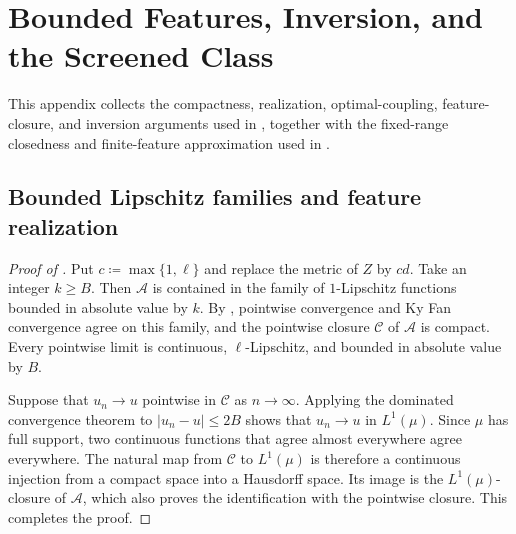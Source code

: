 \documentclass[10pt,a4paper]{amsart}
\begin{document}
\section{Bounded Features, Inversion, and the Screened Class}
\label{app:bounded-feature-inversion}

This appendix collects the compactness, realization, optimal-coupling, feature-closure, and inversion arguments used in , together with the fixed-range closedness and finite-feature approximation used in .

\subsection{Bounded Lipschitz families and feature realization}
\label{subsec:app-bounded-realization}

\begin{proof}[Proof of ]
Put $c\coloneqq\max\{1,\ell\}$ and replace the metric of $Z$ by $cd$. Take an integer $k\geq B$. Then $\mathcal A$ is contained in the family of $1$-Lipschitz functions bounded in absolute value by $k$. By \cite[Lemma~2.2 and Remark~2.3]{hanika2022gds}, pointwise convergence and Ky Fan convergence agree on this family, and the pointwise closure $\mathcal C$ of $\mathcal A$ is compact. Every pointwise limit is continuous, $\ell$-Lipschitz, and bounded in absolute value by $B$.

Suppose that $u_n\to u$ pointwise in $\mathcal C$ as $n\to\infty$. Applying the dominated convergence theorem \cite[Theorem~3.31, pp.~92--93]{axler2020mira} to $|u_n-u|\leq2B$ shows that $u_n\to u$ in $L^1(\mu)$. Since $\mu$ has full support, two continuous functions that agree almost everywhere agree everywhere. The natural map from $\mathcal C$ to $L^1(\mu)$ is therefore a continuous injection from a compact space into a Hausdorff space. Its image is the $L^1(\mu)$-closure of $\mathcal A$, which also proves the identification with the pointwise closure. This completes the proof.
\end{proof}
\end{document}
